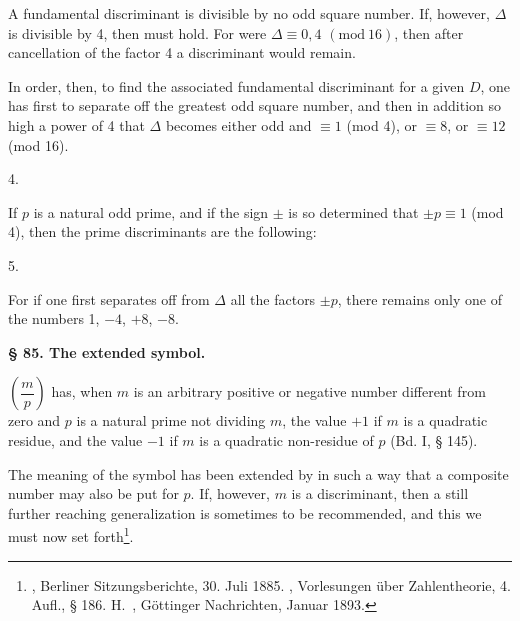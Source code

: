 
A fundamental discriminant is divisible by no odd square number. If, however, $\Delta$ is divisible by 4, then
must hold. For were $\Delta \equiv 0, 4$ $(\mathrm{mod}\ 16)$, then after cancellation of the factor 4 a discriminant would remain.

In order, then, to find the associated fundamental discriminant for a given $D$, one has first to separate off the greatest odd square number, and then in addition so high a power of 4 that $\Delta$ becomes either odd and $\equiv 1$ (mod 4), or $\equiv 8$, or $\equiv 12$ (mod 16).

4. 

If $p$ is a natural odd prime, and if the sign $\pm$ is so determined that $\pm p \equiv 1$ (mod 4), then the prime discriminants are the following:

5. 

For if one first separates off from $\Delta$ all the factors $\pm p$, there remains only one of the numbers 1, $-4$, $+8$, $-8$.

\begin{center}
\textbf{§ 85. The extended  symbol.}
\end{center}

 $\left(\dfrac{m}{p}\right)$ has, when $m$ is an arbitrary positive or negative number different from zero and $p$ is a natural prime not dividing $m$, the value $+1$ if $m$ is a quadratic residue, and the value $-1$ if $m$ is a quadratic non-residue of $p$ (Bd. I, § 145).

The meaning of the symbol has been extended by  in such a way that a composite number may also be put for $p$. If, however, $m$ is a discriminant, then a still further reaching generalization is sometimes to be recommended, and this we must now set forth\footnote{, Berliner Sitzungsberichte, 30. Juli 1885. , Vorlesungen über Zahlentheorie, 4. Aufl., § 186. H.\ , Göttinger Nachrichten, Januar 1893.}.

